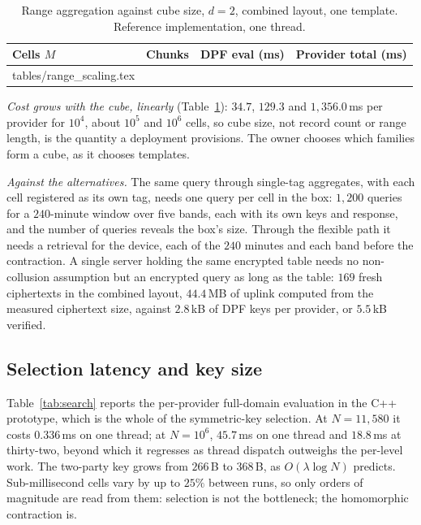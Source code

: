 \documentclass[11pt,a4paper]{article}
\newlength{\tblwidth}\setlength{\tblwidth}{\linewidth}
\begin{document}
\begin{table}[htbp]
\caption{Range aggregation against cube size, $d=2$, combined layout, one
template. Reference implementation, one thread.}
\label{tab:rangescale}
\centering
\footnotesize
\begin{tabular*}{\tblwidth}{@{\extracolsep{\fill}}lccc@{}}
\toprule
Cells $M$ & Chunks & DPF eval (ms) & Provider total (ms) \\
\midrule
{} tables/range_scaling.tex 
\bottomrule
\end{tabular*}
\end{table}

\emph{Cost grows with the cube, linearly} (Table~\ref{tab:rangescale}): $34.7$,
$129.3$ and $1{,}356.0$\,ms per provider for $10^4$, about $10^5$ and $10^6$
cells, so cube size, not record count or range length, is the quantity a
deployment provisions. The owner chooses which families form a cube, as it
chooses templates.

\emph{Against the alternatives.} The same query through single-tag aggregates,
with each cell registered as its own tag, needs one query per cell in the box:
$1{,}200$ queries for a $240$-minute window over five bands, each with its own
keys and response, and the number of queries reveals the box's size. Through
the flexible path it needs a retrieval for the device, each of the $240$
minutes and each band before the contraction. A single server holding the same
encrypted table needs no non-collusion assumption but an encrypted query as long
as the table: $169$ fresh ciphertexts in the combined layout, $44.4$\,MB of
uplink computed from the measured ciphertext size, against $2.8$\,kB of DPF
keys per provider, or $5.5$\,kB verified.


\subsection{Selection latency and key size}
Table~\ref{tab:search} reports the per-provider full-domain evaluation in the
C++ prototype, which is the whole of the symmetric-key selection. At
$N=11{,}580$ it costs $0.336$\,ms on one thread; at $N=10^6$, $45.7$\,ms on one
thread and $18.8$\,ms at thirty-two, beyond which it regresses as thread
dispatch outweighs the per-level work. The two-party key grows from $266$\,B to
$368$\,B, as $O(\lambda\log N)$ predicts. Sub-millisecond cells vary by up to
$25\%$ between runs, so only orders of magnitude are read from them: selection
is not the bottleneck; the homomorphic contraction is.
\end{document}
